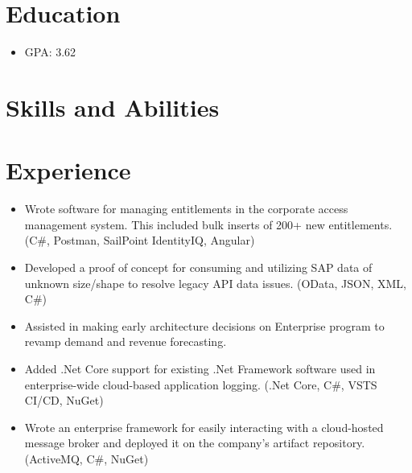 \documentclass[10pt,letterpaper,sans]{moderncv}   %
\begin{document}
\makecvtitle


\section{Education}
{ {}
\begin{itemize}
    \item GPA: 3.62
\end{itemize}}

\section{Skills and Abilities}


\section{Experience}

{ {}
\begin{itemize}
    \item Wrote software for managing entitlements in the corporate access management system. This included bulk inserts of 200+ new entitlements. (C\#, Postman, SailPoint IdentityIQ, Angular)
    \item Developed a proof of concept for consuming and utilizing SAP data of unknown size/shape to resolve legacy API data issues. (OData, JSON, XML, C\#)
    \item Assisted in making early architecture decisions on Enterprise program to revamp demand and revenue forecasting.
    \item Added .Net Core support for existing .Net Framework software used in enterprise-wide cloud-based application logging. (.Net Core, C\#, VSTS CI/CD, NuGet)
    \item Wrote an enterprise framework for easily interacting with a cloud-hosted message broker and deployed it on the company’s artifact repository. (ActiveMQ, C\#, NuGet)
\end{itemize}}
\end{document}
